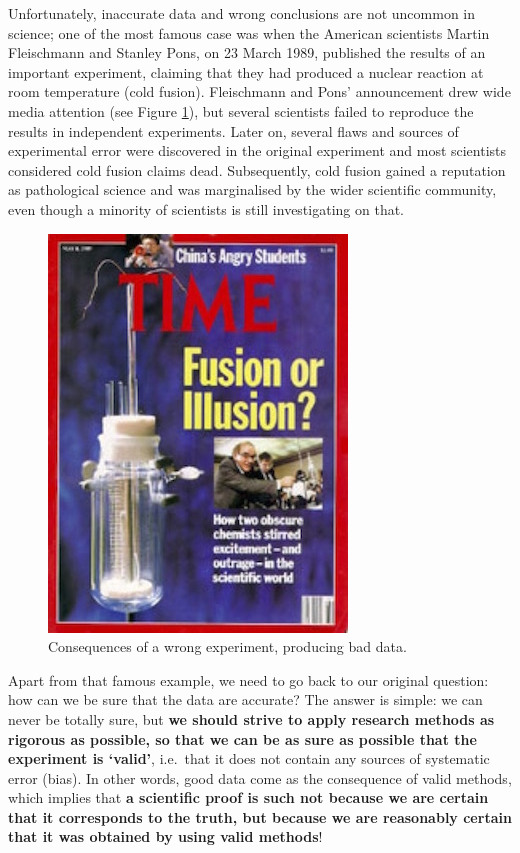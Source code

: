 \documentclass[a4paper,12pt,oneside]{book}
\begin{document}
Unfortunately, inaccurate data and wrong conclusions are not uncommon in science; one of the most famous case was when the American scientists Martin Fleischmann and Stanley Pons, on 23 March 1989, published the results of an important experiment, claiming that they had produced a nuclear reaction at room temperature (cold fusion). Fleischmann and Pons' announcement drew wide media attention (see Figure \ref{fig:figName2}), but several scientists failed to reproduce the results in independent experiments. Later on, several flaws and sources of experimental error were discovered in the original experiment and most scientists considered cold fusion claims dead. Subsequently, cold fusion gained a reputation as pathological science and was marginalised by the wider scientific community, even though a minority of scientists is still investigating on that.

\begin{figure}

{\centering \includegraphics[width=0.5\linewidth]{_images/FalseResults} 

}

\caption{Consequences of a wrong experiment, producing bad data.}\label{fig:figName2}
\end{figure}

Apart from that famous example, we need to go back to our original question: how can we be sure that the data are accurate? The answer is simple: we can never be totally sure, but \textbf{we should strive to apply research methods as rigorous as possible, so that we can be as sure as possible that the experiment is `valid'}, i.e.~that it does not contain any sources of systematic error (bias). In other words, good data come as the consequence of valid methods, which implies that \textbf{a scientific proof is such not because we are certain that it corresponds to the truth, but because we are reasonably certain that it was obtained by using valid methods}!
\end{document}
